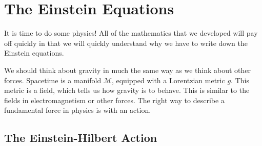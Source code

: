 
\chapter{The Einstein Equations}%
\label{cha:the_einstein_equations}

It is time to do some physics!
All of the mathematics that we developed will pay off quickly in that we will quickly understand why we have to write down the Einstein equations.

We should think about gravity in much the same way as we think about other forces.
Spacetime is a manifold $\mathcal{M}$, equipped with a Lorentzian metric $g$. This metric is a field, which tells us how gravity is to behave. This is similar to the fields in electromagnetism or other forces.
The right way to describe a fundamental force in physics is with an action.

\section{The Einstein-Hilbert Action}%
\label{sec:the_einstein_hilbert_action}

